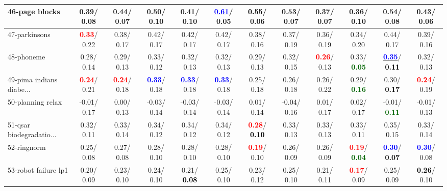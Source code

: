 \begin{table}[h]
\begin{center}
{\begin{tabular}{lc|c|c|c|c|c|c|c|c|c|c}
46-page blocks &   0.39/  0.08 &   0.44/  0.07 &   0.50/  0.10 &   0.41/  0.10 & \underline{\textcolor{blue}{\textbf{  0.61}}}/  0.05 & \textcolor{black}{\textbf{  0.55}}/  0.06 &   0.53/  0.07 &   0.37/  0.07 &   0.36/  0.10 &   0.54/  0.08 &   0.43/  0.06 \\ \hline
47-parkinsons & \textcolor{red}{\textbf{  0.33}}/  0.22 &   0.38/  0.17 &   0.42/  0.17 &   0.42/  0.17 &   0.42/  0.17 &   0.38/  0.16 &   0.37/  0.19 &   0.36/  0.19 &   0.34/  0.20 &   0.44/  0.17 &   0.39/  0.16 \\
48-phoneme &   0.28/  0.14 &   0.29/  0.13 &   0.33/  0.12 &   0.32/  0.13 &   0.32/  0.13 &   0.29/  0.13 &   0.32/  0.15 & \textcolor{red}{\textbf{  0.26}}/  0.13 &   0.33/\textcolor{darkgreen}{\textbf{  0.05}} & \underline{\textcolor{blue}{\textbf{  0.35}}}/\textcolor{black}{\textbf{  0.11}} &   0.32/  0.13 \\
49-pima indians diabe... & \textcolor{red}{\textbf{  0.24}}/  0.21 & \textcolor{red}{\textbf{  0.24}}/  0.18 & \textcolor{blue}{\textbf{  0.33}}/  0.18 & \textcolor{blue}{\textbf{  0.33}}/  0.18 & \textcolor{blue}{\textbf{  0.33}}/  0.18 &   0.25/  0.18 &   0.26/  0.18 &   0.26/  0.22 &   0.29/\textcolor{darkgreen}{\textbf{  0.16}} &   0.30/\textcolor{black}{\textbf{  0.17}} & \textcolor{red}{\textbf{  0.24}}/  0.19 \\
50-planning relax &  -0.01/  0.17 &   0.00/  0.13 &  -0.03/  0.14 &  -0.03/  0.14 &  -0.03/  0.14 &   0.01/  0.14 &  -0.04/  0.16 &   0.01/  0.17 &   0.02/  0.17 &  -0.01/\textcolor{darkgreen}{\textbf{  0.11}} &  -0.01/  0.13 \\
51-qsar biodegradatio... &   0.32/  0.11 &   0.33/  0.14 &   0.34/  0.12 &   0.34/  0.12 &   0.34/  0.12 & \textcolor{red}{\textbf{  0.28}}/\textcolor{black}{\textbf{  0.10}} &   0.33/  0.13 &   0.33/  0.13 &   0.33/  0.11 &   0.35/  0.15 &   0.33/  0.14 \\
52-ringnorm &   0.25/  0.08 &   0.27/  0.08 &   0.28/  0.10 &   0.28/  0.10 &   0.28/  0.10 & \textcolor{red}{\textbf{  0.19}}/  0.10 &   0.26/  0.09 &   0.26/  0.09 & \textcolor{red}{\textbf{  0.19}}/\textcolor{darkgreen}{\textbf{  0.04}} & \textcolor{blue}{\textbf{  0.30}}/\textcolor{black}{\textbf{  0.07}} & \textcolor{blue}{\textbf{  0.30}}/  0.08 \\
53-robot failure lp1 &   0.20/  0.09 &   0.23/  0.10 &   0.24/  0.10 &   0.21/\textcolor{black}{\textbf{  0.08}} &   0.25/  0.10 &   0.23/  0.12 &   0.25/  0.10 &   0.21/  0.11 & \textcolor{red}{\textbf{  0.17}}/  0.09 &   0.25/  0.09 & \textcolor{black}{\textbf{  0.26}}/  0.10 \\ \hline

\end{tabular}}
\end{center}
\end{table}
